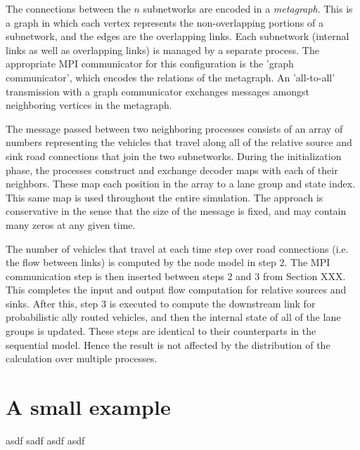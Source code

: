The connections between the $n$ subnetworks are encoded in a \textit{metagraph}. This is a graph in which each vertex represents the non-overlapping portions of a subnetwork, and the edges are the overlapping links. Each subnetwork (internal links as well as overlapping links) is managed by a separate process. The appropriate MPI communicator for this configuration is the 'graph communicator', which encodes the relations of the metagraph. An 'all-to-all' transmission with a graph communicator exchanges messages amongst neighboring vertices in the metagraph. 

The message passed between two neighboring processes consists of an array of numbers representing the vehicles that travel along all of the relative source and sink road connections that join the two subnetworks. During the initialization phase, the processes construct and exchange decoder maps with each of their neighbors. These map each position in the array to a lane group and state index. This same map is used throughout the entire simulation. The approach is conservative in the sense that the size of the message is fixed, and may contain many zeros at any given time. 

The number of vehicles that travel at each time step over road connections (i.e. the flow between links) is computed by the node model in step 2. The MPI communication step is then inserted between steps 2 and 3 from Section XXX. This completes the input and output flow computation for relative sources and sinks. After this, step 3 is executed to compute the downstream link for probabilistic ally routed vehicles, and then the internal state of all of the lane groups is updated. These steps are identical to their counterparts in the sequential model. Hence the result is not affected by the distribution of the calculation over multiple processes.

\section{A small example}
asdf sadf asdf asdf 


